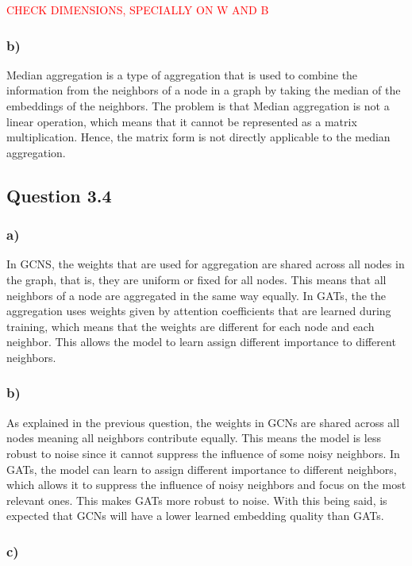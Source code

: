 \documentclass{article}
\begin{document}
\textcolor{red}{CHECK DIMENSIONS, SPECIALLY ON W AND B}

\subsubsection*{b)}

Median aggregation is a type of aggregation that is used to combine the information from the neighbors of a node in a graph
by taking the median of the embeddings of the neighbors. The problem is that Median aggregation is not a linear
operation, which means that it cannot be represented as a matrix multiplication. Hence, the matrix form is not
directly applicable to the median aggregation.

\subsection*{Question 3.4}

\subsubsection*{a)}

In GCNS, the weights that are used for aggregation are shared across all nodes in the graph, that is, they are uniform
or fixed for all nodes. This means that all neighbors of a node are aggregated in the same way equally. In GATs,
the the aggregation uses weights given by attention coefficients that are learned during training, which means that
the weights are different for each node and each neighbor. This allows the model to learn assign different importance
to different neighbors. 

\subsubsection*{b)}

As explained in the previous question, the weights in GCNs are shared across all nodes meaning all neighbors contribute equally. This means the model is
less robust to noise since it cannot suppress the influence of some noisy neighbors. In GATs, the model can learn to assign
different importance to different neighbors, which allows it to suppress the influence of noisy neighbors and focus on the
most relevant ones. This makes GATs more robust to noise. With this being said, is expected that GCNs will have a lower
learned embedding quality than GATs.

\subsubsection*{c)}
\end{document}
